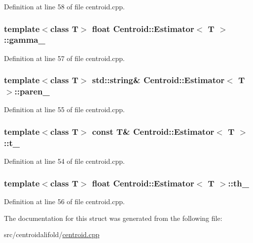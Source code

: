 Definition at line 58 of file centroid.\+cpp.

\hypertarget{struct_centroid_1_1_estimator_ad22e480a14f6b3217c53ebd4c300e1d0}{
\subsubsection[{gamma\+\_\+}]{\setlength{\rightskip}{0pt plus 5cm}template$<$class T$>$ float {\bf Centroid\+::\+Estimator}$<$ T $>$\+::gamma\+\_\+}}\label{struct_centroid_1_1_estimator_ad22e480a14f6b3217c53ebd4c300e1d0}


Definition at line 57 of file centroid.\+cpp.

\hypertarget{struct_centroid_1_1_estimator_afb0a8a732c11deb042d0bb1ac5bb54ce}{
\subsubsection[{paren\+\_\+}]{\setlength{\rightskip}{0pt plus 5cm}template$<$class T$>$ std\+::string\& {\bf Centroid\+::\+Estimator}$<$ T $>$\+::paren\+\_\+}}\label{struct_centroid_1_1_estimator_afb0a8a732c11deb042d0bb1ac5bb54ce}


Definition at line 55 of file centroid.\+cpp.

\hypertarget{struct_centroid_1_1_estimator_a877f55030c8443d3f26dc7d17ff0bbff}{
\subsubsection[{t\+\_\+}]{\setlength{\rightskip}{0pt plus 5cm}template$<$class T$>$ const T\& {\bf Centroid\+::\+Estimator}$<$ T $>$\+::t\+\_\+}}\label{struct_centroid_1_1_estimator_a877f55030c8443d3f26dc7d17ff0bbff}


Definition at line 54 of file centroid.\+cpp.

\hypertarget{struct_centroid_1_1_estimator_a3c52755a2eea48a354dfb71eba71600f}{
\subsubsection[{th\+\_\+}]{\setlength{\rightskip}{0pt plus 5cm}template$<$class T$>$ float {\bf Centroid\+::\+Estimator}$<$ T $>$\+::th\+\_\+}}\label{struct_centroid_1_1_estimator_a3c52755a2eea48a354dfb71eba71600f}


Definition at line 56 of file centroid.\+cpp.



The documentation for this struct was generated from the following file\+:\begin{DoxyCompactItemize}
\item 
src/centroidalifold/\hyperlink{centroid_8cpp}{centroid.\+cpp}\end{DoxyCompactItemize}
